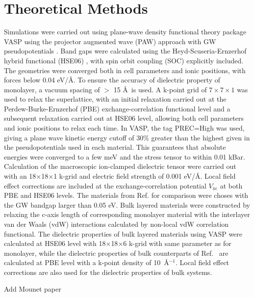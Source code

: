 \documentclass[journal=ancac3,manuscript=article,email=true,hyperref=true,keywords=false]{achemso}
\begin{document}
\section{Theoretical Methods}
\label{sec:org8457dbb}

Simulations were carried out using plane-wave density functional
theory package VASP \cite{Kresse_1993,Kresse_1996_1,Kresse_1996_2}
using the projector augmented wave (PAW) approach with GW
pseudopotentials \cite{Kresse_1999_pseudopotentials}. Band gaps were
calculated using the Heyd-Scuseria-Ernzerhof hybrid functional (HSE06)
\cite{Heyd_2003,HSE_2006}, with spin orbit coupling (SOC) explicitly
included. The geometries were converged both in cell parameters and
ionic positions, with forces below 0.04 eV/\AA. To ensure the accuracy
of dielectric property of monolayer, a vacuum spacing of $>$ 15 \AA~is
used. A k-point grid of \(7\times7\times1\) was used to relax the
superlattice, with an initial relaxation carried out at the
Perdew-Burke-Ernzerhof
(PBE)\cite{Perdew_1996,Ernzerhof_1999,Paier_2005_PBE}
exchange-correlation functional level and a subsequent relaxation
carried out at HSE06 level, allowing both cell parameters and ionic
positions to relax each time. In VASP, the tag PREC=High was used,
giving a plane wave kinetic energy cutoff of 30\% greater than the
highest given in the pseudopotentials used in each material. This
guarantees that absolute energies were converged to a few meV and the
stress tensor to within 0.01 kBar.  Calculation of the macroscopic
ion-clamped dielectric tensor were carried out with an
18$\times$18$\times$1 k-grid and electric field strength of 0.001
eV/\AA.  Local field effect corrections are included at the
exchange-correlation potential $V_{\mathrm{xc}}$ at both PBE and HSE06
levels. The materials from Ref. for comparison
were choses with the GW bandgap larger than 0.05 eV. Bulk layered
materials were constructed by relaxing the c-axis length of
corresponding monolayer material with the interlayer van der Waals
(vdW) interactions calculated by non-local vdW correlation
functional\cite{Lee_2010_vdFD2}.  The dielectric properties of bulk
layered materials using VASP were calculated at HSE06 level with
18$\times$18$\times$6 k-grid with same parameter as for monolayer,
while the dielectric properties of bulk counterparts of
Ref.~ are calculated at PBE level with a
k-point density of 10~\AA$^{-1}$. Local field effect corrections are
also used for the dielectric properties of bulk systems.

Add Mounet paper \cite{Mounet_2018}
\end{document}
